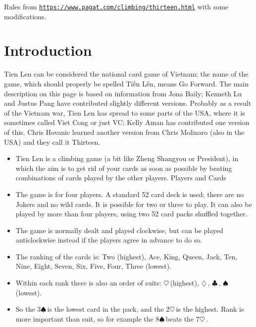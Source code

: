 \documentclass[12pt]{article}
\newcommand{\heart}{$\heartsuit$\,}
\renewcommand{\diamond}{$\diamondsuit$\,}
\newcommand{\spade}{$\spadesuit$\,}
\newcommand{\club}{$\clubsuit$\,}
\begin{document}
	
	Rules from \href{https://www.pagat.com/climbing/thirteen.html}{\texttt{https://www.pagat.com/climbing/thirteen.html}} with some modifications.

\section{Introduction}

Tien Len can be considered the national card game of Vietnam; the name of the game, which should properly be spelled Ti\'{\^{e}}n L\^{e}n, means Go Forward. The main description on this page is based on information from Jona Baily; Kenneth Lu and Justus Pang have contributed slightly different versions. Probably as a result of the Vietnam war, Tien Len has spread to some parts of the USA, where it is sometimes called Viet Cong or just VC; Kelly Aman has contributed one version of this. Chris Hovanic learned another version from Chris Molinaro (also in the USA) and they call it Thirteen.

\begin{itemize}
\item Tien Len is a climbing game (a bit like Zheng Shangyou or President), in which the aim is to get rid of your cards as soon as possible by beating combinations of cards played by the other players.
Players and Cards

\item The game is for four players. A standard 52 card deck is used; there are no Jokers and no wild cards. It is possible for two or three to play. It can also be played by more than four players, using two 52 card packs shuffled together.

\item The game is normally dealt and played clockwise, but can be played anticlockwise instead if the players agree in advance to do so.

\item The ranking of the cards is: Two (highest), Ace, King, Queen, Jack, Ten, Nine, Eight, Seven, Six, Five, Four, Three (lowest).

\item Within each rank there is also an order of suits: \heart (highest), \diamond, \club, \spade (lowest).

\item So the 3\spade is the lowest card in the pack, and the 2\heart is the highest. Rank is more important than suit, so for example the 8\spade beats the 7\heart.
\end{itemize}
\end{document}

